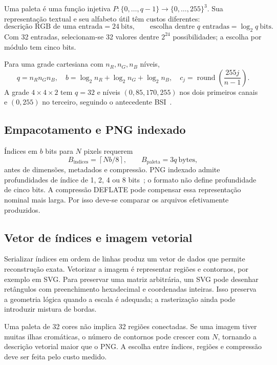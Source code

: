 \documentclass[11pt,a4paper]{article}
\begin{document}
Uma paleta é uma função injetiva $P:\{0,\ldots,q-1\}\to\{0,\ldots,255\}^3$. Sua representação textual e seu alfabeto útil têm custos diferentes:
\begin{equation}
\text{descrição RGB de uma entrada}=24\ \text{bits},\qquad
\text{escolha dentre }q\text{ entradas}=\log_2q\ \text{bits}.
\end{equation}
Com 32 entradas, selecionam-se 32 valores dentre $2^{24}$ possibilidades; a escolha por módulo tem cinco bits.

Para uma grade cartesiana com $n_R,n_G,n_B$ níveis,
\begin{equation}
q=n_Rn_Gn_B,\quad b=\log_2n_R+\log_2n_G+\log_2n_B,
\quad c_j=\operatorname{round}\left(\frac{255j}{n-1}\right).
\end{equation}
A grade $4\times4\times2$ tem $q=32$ e níveis $(0,85,170,255)$ nos dois primeiros canais e $(0,255)$ no terceiro, seguindo o antecedente BSI~\cite{2020bsiJab}.

\subsection{Empacotamento e PNG indexado}
Índices em $b$ bits para $N$ pixels requerem
\begin{equation}
B_{\text{índices}}=\left\lceil Nb/8\right\rceil,
\qquad B_{\mathrm{paleta}}=3q\ \text{bytes},
\end{equation}
antes de dimensões, metadados e compressão. PNG indexado admite profundidades de índice de 1, 2, 4 ou 8 bits~\cite{2025w3cPng}; o formato não define profundidade de cinco bits. A compressão DEFLATE pode compensar essa representação nominal mais larga. Por isso deve-se comparar os arquivos efetivamente produzidos.

\subsection{Vetor de índices e imagem vetorial}
Serializar índices em ordem de linhas produz um vetor de dados que permite reconstrução exata. Vetorizar a imagem é representar regiões e contornos, por exemplo em SVG. Para preservar uma matriz arbitrária, um SVG pode desenhar retângulos com preenchimento hexadecimal e coordenadas inteiras. Isso preserva a geometria lógica quando a escala é adequada; a rasterização ainda pode introduzir mistura de bordas.

Uma paleta de 32 cores não implica 32 regiões conectadas. Se uma imagem tiver muitas ilhas cromáticas, o número de contornos pode crescer com $N$, tornando a descrição vetorial maior que o PNG. A escolha entre índices, regiões e compressão deve ser feita pelo custo medido.
\end{document}
